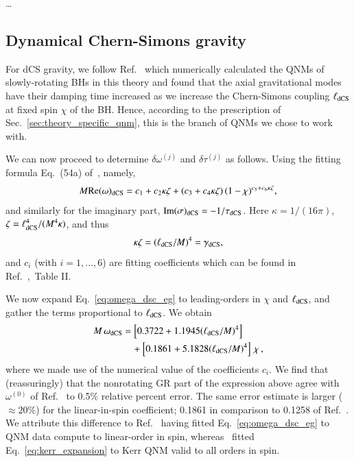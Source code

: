 \documentclass[twocolumn,
               prd,
               aps,
               superscriptaddress,
               tightenlines,
               nofootinbib,
               eqsecnum,
               amsfonts,
               amsmath,
               longbibliography]{revtex4-1}
\begin{document}
\dots


\subsection{Dynamical Chern-Simons gravity}
\label{app:map_dcs}

For dCS gravity, we follow Ref.~\cite{Wagle:2021tam} which numerically calculated the QNMs of slowly-rotating BHs in this theory
and found that the axial gravitational modes have their damping time increased as we
increase the Chern-Simons coupling $\ell_{\rm dCS}$ at fixed spin $\chi$ of the BH.
%
Hence, according to the prescription of Sec.~\ref{sec:theory_specific_qnm},
this is the branch of QNMs we chose to work with.

We can now proceed to determine $\delta\omega^{(j)}$ and $\delta\tau^{(j)}$ as follows.
%
Using the fitting formula Eq.~(54a) of~\cite{Wagle:2021tam}, namely,
%
\begin{equation}
    M {\rm Re}(\omega)_{\rm dCS} = c_{1} + c_{2} \kappa \zeta + (c_{3} + c_{4} \kappa \zeta) \, (1 - \chi)^{c_{5} + c_{6} \kappa \zeta},
    \label{eq:omega_dsc_eg}
\end{equation}
%
and similarly for the imaginary part, ${\rm Im}(\sigma)_{\rm dCS} =  - 1 / \tau_{\rm dCS}$.
%
Here $\kappa = 1/(16 \pi)$, $\zeta = \ell_{\rm dCS}^{4} / (M^4 \kappa)$, and thus
%
\begin{equation}
    \kappa \zeta = (\ell_{\rm dCS} / M)^4 = \gamma_{\rm dCS},
\end{equation}
%
and $c_{i}$ (with $i=1, \dots, 6$) are fitting coefficients which can be found in
Ref.~\cite{Wagle:2021tam},~Table II.

We now expand Eq.~\eqref{eq:omega_dsc_eg} to leading-orders in $\chi$ and $\ell_{\rm dCS}$, and
gather the terms proportional to $\ell_{\rm dCS}$.
%
We obtain
%
\begin{align}
    M \, \omega_{\rm dCS} &=
    \left[ 0.3722 + 1.1945 (\ell_{\rm dCS} / M)^4 \right]
    \nonumber \\
    &\quad + \left[0.1861 + 5.1828 (\ell_{\rm dCS} / M)^4 \right] \, \chi\,,
    \label{eq:omega_dcs_interm}
\end{align}
%
where we made use of the numerical value of the coefficients $c_{i}$.
%
We find that (reassuringly) that the nonrotating GR part of the expression above agree with $\omega^{(0)}$ of Ref.~\cite{Maselli:2019mjd}
to 0.5\% relative percent error. The same error estimate is larger ($\approx 20$\%) for the linear-in-spin coefficient;
0.1861 in comparison to 0.1258 of Ref.~\cite{Maselli:2019mjd}.
%
We attribute this difference to Ref.~\cite{Wagle:2021tam} having fitted Eq.~\eqref{eq:omega_dsc_eg} to QNM data compute to linear-order in spin, whereas~\cite{Maselli:2019mjd}
fitted Eq.~\eqref{eq:kerr_expansion} to Kerr QNM valid to all orders in spin.
\end{document}
